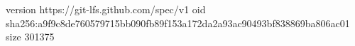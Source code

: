 version https://git-lfs.github.com/spec/v1
oid sha256:a9f9c8de760579715bb090fb89f153a172da2a93ac90493bf838869ba806ac01
size 301375
